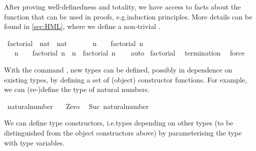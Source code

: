 \begin{isabellebody}
\begin{isamarkuptext}
After proving well-definedness and totality, we have access to facts about the function that can be used in proofs, e.g.\@ induction principles. More details can be found in \cref{sec:HML}, where we define a non-trivial .%
\end{isamarkuptext}\isamarkuptrue%
%
\isadelimvisible
%
\endisadelimvisible
%
\isatagvisible
{}\isamarkupfalse%
\ factorial\ {\isacharcolon}{\kern0pt}{\isacharcolon}{\kern0pt}\ {\isacartoucheopen}nat\ {\isasymRightarrow}\ nat{\isacartoucheclose}\isanewline
\ \ \isanewline
\ \ \ \ {\isacartoucheopen}n\ {\isacharequal}{\kern0pt}\ {}\ {\isasymLongrightarrow}\ factorial\ n\ {\isacharequal}{\kern0pt}\ {}{\isacartoucheclose}\isanewline
\ \ {\isacharbar}{\kern0pt}\ {\isacartoucheopen}n\ {\isachargreater}{\kern0pt}\ {}\ {\isasymLongrightarrow}\ factorial\ n\ {\isacharequal}{\kern0pt}\ n\ {\isacharasterisk}{\kern0pt}\ factorial\ {\isacharparenleft}{\kern0pt}n{\isacharminus}{\kern0pt}{}{\isacharparenright}{\kern0pt}{\isacartoucheclose}\isanewline
\ \ \isamarkupfalse%
\ auto\isanewline
\isanewline
{}\isamarkupfalse%
\ factorial\ \isamarkupfalse%
\ {\isachardoublequoteopen}termination{\isachardoublequoteclose}\ \isamarkupfalse%
\ force%
\endisatagvisible
{\isafoldvisible}%
%
\isadelimvisible
%
\endisadelimvisible
%
\isadelimdocument
%
\endisadelimdocument
%
\isatagdocument
%
\isamarkuptrue%
%
\endisatagdocument
{\isafolddocument}%
%
\isadelimdocument
%
\endisadelimdocument
%
\begin{isamarkuptext}%
With the command , new types can be defined, possibly in dependence on existing types, by defining a set of (object) constructor functions. For example, we can (re-)define the type of natural numbers.%
\end{isamarkuptext}\isamarkuptrue%
\isamarkupfalse%
\ natural{\isacharunderscore}{\kern0pt}number\ {\isacharequal}{\kern0pt}\isanewline
\ \ Zero\ %
\isanewline
{\isacharbar}{\kern0pt}\ Suc\ {\isacartoucheopen}natural{\isacharunderscore}{\kern0pt}number{\isacartoucheclose}\ %
%
\begin{isamarkuptext}%
We can define type constructors, i.e.\@ types depending on other types (to be distinguished from the object constructors above) by parameterising the type with type variables.%

\end{isamarkuptext}
\end{isabellebody}
